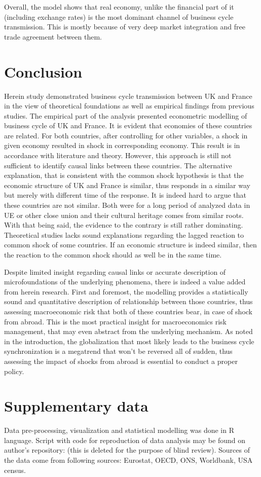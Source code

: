 \documentclass{article}
\begin{document}
Overall, the model shows that real economy, unlike the financial part of it (including exchange rates) is the most dominant channel of business cycle transmission. This is mostly because of very deep market integration and free trade agreement between them. 

\section*{Conclusion}

Herein study demonstrated business cycle transmission between UK and France in the view of theoretical foundations as well as empirical findings from previous studies. The empirical part of the analysis presented econometric modelling of business cycle of UK and France. It is evident that economies of these countries are related. For both countries, after controlling for other variables, a shock in given economy resulted in shock in corresponding economy. This result is in accordance with literature and theory. However, this approach is still not sufficient to identify causal links between these countries. The alternative explanation, that is consistent with the common shock hypothesis is that the economic structure of UK and France is similar, thus responds in a similar way but merely with different time of the response. It is indeed hard to argue that these countries are not similar. Both were for a long period of analyzed data in UE or other close union and their cultural heritage comes from similar roots. With that being said, the evidence to the contrary is still rather dominating. Theoretical studies lacks sound explanations regarding the lagged reaction to common shock of some countries. If an economic structure is indeed similar, then the reaction to the common shock should as well be in the same time. 


Despite limited insight regarding causal links or accurate description of microfoundations of the underlying phenomena, there is indeed a value added from herein research. First and foremost, the modelling provides a statistically sound and quantitative description of relationship between those countries, thus assessing macroeconomic risk that both of these countries bear, in case of shock from abroad. This is the most practical insight for macroeconomics risk management, that may even abstract from the underlying mechanism. As noted in the introduction, the globalization that most likely leads to the business cycle synchronization is a megatrend that won't be reversed all of sudden, thus assessing the impact of shocks from abroad is essential to conduct a proper policy. 

\section*{Supplementary data}

Data pre-processing, visualization and statistical modelling was done in R language. Script with code for reproduction of data analysis may be found on author's repository: (this is deleted for the purpose of blind review). Sources of the data come from following sources: Eurostat, OECD, ONS, Worldbank, USA census.




\end{document}
